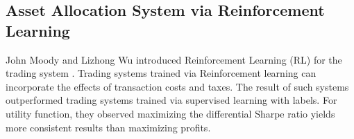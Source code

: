 \subsection{Asset Allocation System via Reinforcement Learning}
John Moody and Lizhong Wu introduced Reinforcement Learning (RL) for the trading system \cite{618952}. Trading systems trained via Reinforcement learning can incorporate the effects of transaction costs and taxes. The result of such systems outperformed trading systems trained via supervised learning with labels. For utility function, they observed maximizing the differential Sharpe ratio yields more consistent results than maximizing profits\cite{618952}.\\
